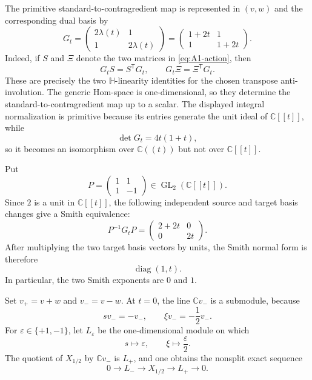 \documentclass[10pt,a4paper]{amsart}
\newcommand{\Hh}{\mathbb H}
\newcommand{\C}{\mathbb C}
\newcommand{\A}{\C[[t]]}
\newcommand{\K}{\C((t))}
\begin{document}
The primitive standard-to-contragredient map is represented in $(v,w)$ and
the corresponding dual basis by
\begin{equation}\label{eq:A1-intertwiner}
 G_t=
 \begin{pmatrix}2\lambda(t)&1\\1&2\lambda(t)\end{pmatrix}
 =\begin{pmatrix}1+2t&1\\1&1+2t\end{pmatrix}.
\end{equation}
Indeed, if $S$ and $\Xi$ denote the two matrices in
\eqref{eq:A1-action}, then
\[
 G_tS=S^{\mathsf T}G_t,
 \qquad
 G_t\Xi=\Xi^{\mathsf T}G_t.
\]
These are precisely the two $\Hh$-linearity identities for the chosen
transpose anti-involution.  The generic Hom-space is one-dimensional, so
they determine the standard-to-contragredient map up to a scalar.  The
displayed integral normalization is primitive because its entries generate
the unit ideal of $\A$, while
\[
 \det G_t=4t(1+t),
\]
so it becomes an isomorphism over $\K$ but not over $\A$.

\begin{samepage}
Put
\[
 P=\begin{pmatrix}1&1\\1&-1\end{pmatrix}\in\operatorname{GL}_2(\A).
\]
Since $2$ is a unit in $\A$, the following independent source and target
basis changes give a Smith equivalence:
\[
 P^{-1}G_tP
 =\begin{pmatrix}2+2t&0\\0&2t\end{pmatrix}.
\]
After multiplying the two target basis vectors by units, the Smith normal
form is therefore
\begin{equation}\label{eq:A1-smith}
 \operatorname{diag}(1,t).
\end{equation}
In particular, the two Smith exponents are $0$ and $1$.
\end{samepage}

Set $v_+=v+w$ and $v_-=v-w$.  At $t=0$, the line
$\mathbb Cv_-$ is a submodule, because
\[
 sv_-=-v_-,\qquad \xi v_-=-\frac12v_-.
\]
For $\varepsilon\in\{+1,-1\}$, let $L_\varepsilon$ be the one-dimensional
module on which
\[
 s\longmapsto\varepsilon,
 \qquad
 \xi\longmapsto\frac{\varepsilon}{2}.
\]
The quotient of $X_{1/2}$ by $\mathbb Cv_-$ is $L_+$, and one obtains the
nonsplit exact sequence
\[
 0\longrightarrow L_-
 \longrightarrow X_{1/2}
 \longrightarrow L_+\longrightarrow0.
\]
\end{document}
